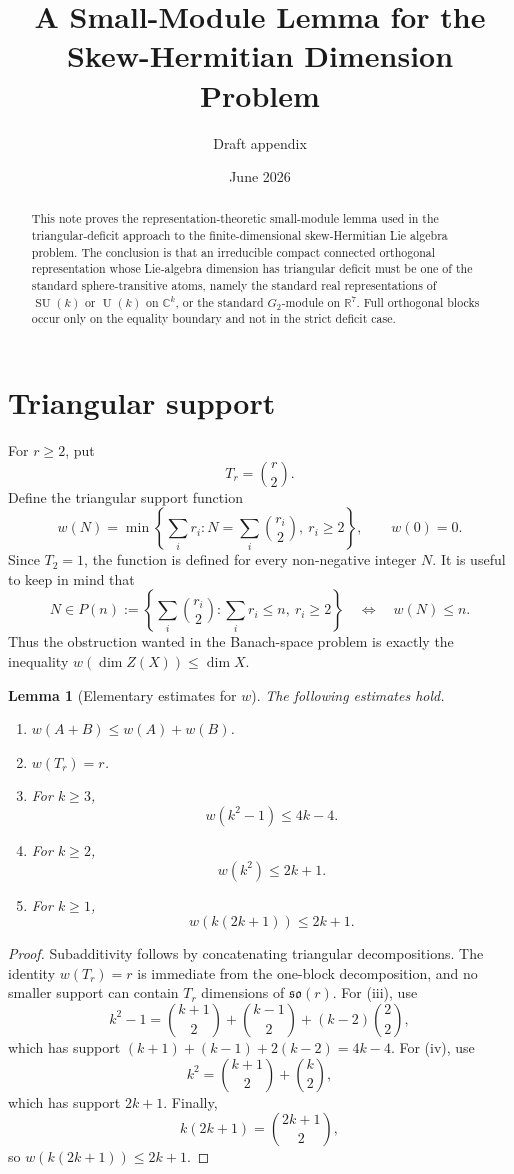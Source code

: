 \documentclass[11pt]{article}
\title{A Small-Module Lemma for the Skew-Hermitian Dimension Problem}
\author{Draft appendix}
\date{June 2026}
\newtheorem{lemma}[theorem]{Lemma}
\theoremstyle{remark}
\newcommand{\RR}{\mathbb{R}}
\newcommand{\CC}{\mathbb{C}}
\newcommand{\so}{\mathfrak{so}}
\newcommand{\SU}{\operatorname{SU}}
\newcommand{\U}{\operatorname{U}}
\newcommand{\Gtwo}{G_2}
\begin{document}
\maketitle

\begin{abstract}
This note proves the representation-theoretic small-module lemma used in the triangular-deficit approach to the finite-dimensional skew-Hermitian Lie algebra problem.  The conclusion is that an irreducible compact connected orthogonal representation whose Lie-algebra dimension has triangular deficit must be one of the standard sphere-transitive atoms, namely the standard real representations of \(\SU(k)\) or \(\U(k)\) on \(\CC^k\), or the standard \(\Gtwo\)-module on \(\RR^7\).  Full orthogonal blocks occur only on the equality boundary and not in the strict deficit case.
\end{abstract}

\section{Triangular support}

For \(r\geq 2\), put
\[
  T_r=\binom r2.
\]
Define the triangular support function
\[
  w(N)=\min\left\{\sum_i r_i:
       N=\sum_i \binom{r_i}{2},\ r_i\geq 2\right\},
       \qquad w(0)=0.
\]
Since \(T_2=1\), the function is defined for every non-negative integer \(N\).
It is useful to keep in mind that
\[
  N\in P(n):=\left\{\sum_i \binom{r_i}{2}:\sum_i r_i\leq n,\ r_i\geq 2\right\}
  \quad\Longleftrightarrow\quad
  w(N)\leq n.
\]
Thus the obstruction wanted in the Banach-space problem is exactly the inequality
\(w(\dim Z(X))\leq \dim X\).

\begin{lemma}[Elementary estimates for \(w\)]\label{lem:w-estimates}
The following estimates hold.
\begin{enumerate}[label=\textup{(\roman*)}]
\item \(w(A+B)\leq w(A)+w(B)\).
\item \(w(T_r)=r\).
\item For \(k\geq 3\),
\[
   w(k^2-1)\leq 4k-4.
\]
\item For \(k\geq 2\),
\[
   w(k^2)\leq 2k+1.
\]
\item For \(k\geq 1\),
\[
   w(k(2k+1))\leq 2k+1.
\]
\end{enumerate}
\end{lemma}

\begin{proof}
Subadditivity follows by concatenating triangular decompositions.  The identity \(w(T_r)=r\) is immediate from the one-block decomposition, and no smaller support can contain \(T_r\) dimensions of \(\so(r)\).
For (iii), use
\[
  k^2-1=\binom{k+1}{2}+\binom{k-1}{2}+(k-2)\binom22,
\]
which has support \((k+1)+(k-1)+2(k-2)=4k-4\).  For (iv), use
\[
  k^2=\binom{k+1}{2}+\binom k2,
\]
which has support \(2k+1\).  Finally,
\[
  k(2k+1)=\binom{2k+1}{2},
\]
so \(w(k(2k+1))\leq 2k+1\).
\end{proof}
\end{document}
